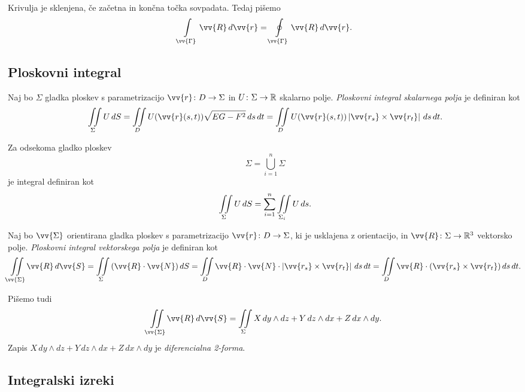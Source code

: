 \begin{opomba}
Krivulja je sklenjena, če začetna in končna točka sovpadata. Tedaj
pišemo
\[
\lint_{\vv{\Gamma}} \vv{R}\,d\vv{r} =
\olint_{\vv{\Gamma}} \vv{R}\,d\vv{r}.
\]
\end{opomba}

\newpage

\subsection{Ploskovni integral}

\begin{definicija}
Naj bo $\Sigma$ gladka ploskev s parametrizacijo
$\vv{r} \colon D \to \Sigma$ in $U \colon \Sigma \to \mathbb{R}$ skalarno
polje.
\emph{Ploskovni integral skalarnega polja}
je definiran kot
\[
\liint_\Sigma U\,dS =
\liint_D U(\vv{r}(s,t)) \sqrt{EG - F^2}\,ds\,dt =
\liint_D U(\vv{r}(s,t)) \abs{\vv{r_s} \times \vv{r_t}}\,ds\,dt.
\]
\end{definicija}

\begin{opomba}
Za odsekoma gladko ploskev
\[
\Sigma = \bigcup_{i=1}^n \Sigma
\]
je integral definiran kot
\[
\iint\limits_\Sigma U\,dS =
\sum_{i=1}^n \iint\limits_{\Sigma_i} U\,ds.
\]
\end{opomba}

\begin{definicija}
Naj bo $\vv{\Sigma}$ orientirana gladka ploskev s parametrizacijo
$\vv{r} \colon D \to \Sigma$, ki je usklajena z orientacijo, in
$\vv{R} \colon \Sigma \to \R^3$ vektorsko polje. \emph{Ploskovni
integral vektorskega polja} je definiran kot
\[
\liint_{\vv{\Sigma}} \vv{R}\,d\vv{S} =
\liint_\Sigma \left(\vv{R} \cdot \vv{N}\right)dS =
\liint_D \vv{R} \cdot \vv{N} \cdot
\abs{\vv{r_s} \times \vv{r_t}}\,ds\,dt =
\liint_D \vv{R} \cdot (\vv{r_s} \times \vv{r_t})\,ds\,dt.
\]
\end{definicija}

\begin{opomba}
Pišemo tudi
\[
\liint_{\vv{\Sigma}} \vv{R}\,d\vv{S} =
\liint_\Sigma X\,dy \wedge dz + Y\,dz \wedge dx + Z\,dx \wedge dy.
\]
Zapis $X\,dy \wedge dz + Y\,dz \wedge dx + Z\,dx \wedge dy$ je
\emph{diferencialna 2-forma}.
\end{opomba}

\newpage

\subsection{Integralski izreki}

